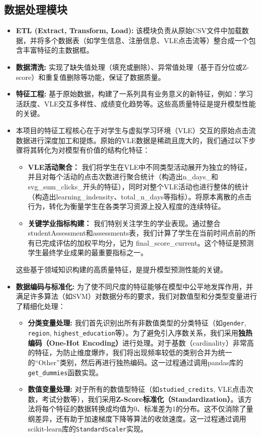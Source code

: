 \documentclass{SYSUReport}
\begin{document}
\subsection{数据处理模块}
\begin{itemize}
    \item \textbf{ETL (Extract, Transform, Load):} 该模块负责从原始CSV文件中加载数据，并将多个数据表（如学生信息、注册信息、VLE点击流等）整合成一个包含丰富特征的主数据框。
    \item \textbf{数据清洗:} 实现了缺失值处理（填充或删除）、异常值处理（基于百分位或Z-score）和重复值删除等功能，保证了数据质量。
    \item \textbf{特征工程:} 基于原始数据，构建了一系列具有业务意义的新特征，例如：学习活跃度、VLE交互多样性、成绩变化趋势等。这些高质量特征是提升模型性能的关键。
    \item \par
    本项目的特征工程核心在于对学生与虚拟学习环境（VLE）交互的原始点击流数据进行深度加工和提炼。原始的VLE数据是稀疏且庞大的，我们通过以下步骤将其转化为对模型有价值的结构化特征：
    \begin{itemize}
        \item \textbf{VLE活动聚合：} 我们将学生在VLE中不同类型活动展开为独立的特征，并且对每个活动的点击次数进行聚合统计（构造出n\_days\_和svg\_sum\_clicks\_开头的特征），同时对整个VLE活动也进行整体的统计（构造出learning\_indensity、total\_n\_days等指标）。将原本离散的点击行为，转化为衡量学生在各类学习资源上投入程度的连续特征。
        \item \textbf{关键学业指标构建：} 我们特别关注学生的学业表现。通过整合studentAssessment和assessments表，我们计算了学生在当前时间点前的所有已完成评估的加权平均分，记为 final\_score\_current。这个特征是预测学生最终学业成果的最重要指标之一。
    \end{itemize}
    这些基于领域知识构建的高质量特征，是提升模型预测性能的关键。
    \item \textbf{数据编码与标准化:} 为了使不同尺度的特征能够在模型中公平地发挥作用，并满足许多算法（如SVM）对数据分布的要求，我们对数值型和分类型变量进行了精细化处理：
    \begin{itemize}
        \item \textbf{分类变量处理:} 我们首先识别出所有非数值类型的分类特征（如\texttt{gender}, \texttt{region}, \texttt{highest\_education}等）。为了避免引入序数关系，我们采用\textbf{独热编码（One-Hot Encoding）}进行处理。对于基数（cardinality）非常高的特征，为防止维度爆炸，我们将出现频率较低的类别合并为统一的“Other”类别，然后再进行独热编码。这一过程通过调用pandas库的\texttt{get\_dummies}函数实现。
        \item \textbf{数值变量处理:} 对于所有的数值型特征（如\texttt{studied\_credits}, VLE点击次数，考试分数等），我们采用\textbf{Z-Score标准化（Standardization）}。该方法将每个特征的数据转换成均值为0、标准差为1的分布。这不仅消除了量纲差异，还有助于加速梯度下降等算法的收敛速度。这一过程通过调用scikit-learn库的\texttt{StandardScaler}实现。
    \end{itemize}
\end{itemize}
\end{document}
